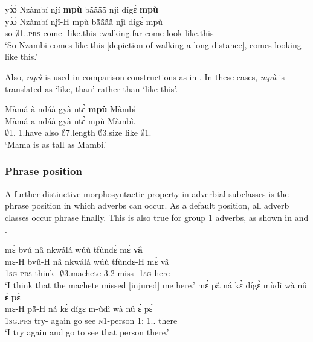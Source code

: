\ea \label{ADVmpu1}
  \glll yɔ́ɔ̀ Nzàmbí njí {\bfseries mpù} bã̂ã̂ã̂ã̂ njì dígɛ̀ {\bfseries mpù} \\
       yɔ́ɔ̀ Nzàmbí njî-H mpù bã̂ã̂ã̂ã̂ njì dígɛ̀ mpù \\
        so $\emptyset$1.{\PN}.\textsc{prs} come-{\R} like.this {\IDEO}:walking.far come look like.this \\
    \trans `So Nzambi comes like this [depiction of walking a long distance], comes looking like this.'
\z

\noindent   Also, {\itshape mpù} is used in comparison constructions as in . In these cases, {\itshape mpù} is translated as `like, than' rather than `like this'.

\ea \label{ADVmpu2}
  \glll Màmá à ndáà gyà ntɛ̀ {\bfseries mpù} Màmbì \\
       Màmá a ndáà gyà ntɛ̀ mpù Màmbì.  \\
        $\emptyset$1.{\PN}  1.have also $\emptyset$7.length $\emptyset$3.size like $\emptyset$1.{\PN} \\
    \trans `Mama is as tall as Mambi.'
\z
\fi %

\subsubsection*{Phrase position}
A further distinctive morphosyntactic property in adverbial subclasses is the phrase position in which adverbs can occur. As a default position, all adverb classes occur phrase finally. This is also true for group 1 adverbs, as shown in  and .

\ea \label{ADV1finala}
  \glll    mɛ́ bvú nâ nkwálá wúù tfùndɛ́ mɛ̀ {\bfseries vâ} \\
           mɛ-H bvû-H nâ nkwálá wúù tfùndɛ-H mɛ̀ vâ \\
              1\textsc{sg}-\textsc{prs} think-{\R} {\COMP} $\emptyset$3.machete 3.{\PST}2 miss-{\R} 1\textsc{sg} here \\
    \trans `I think that the machete missed [injured] me here.'
\ex \label{ADV1finalb}
  \glll mɛ́ pã́ ná kɛ̀ dígɛ̀ mùdì wà nû {\bfseries ɛ́} {\bfseries pɛ́} \\
        mɛ-H pã̂-H ná kɛ̀ dígɛ m-ùdì wà nû ɛ́ pɛ́ \\
        1\textsc{sg}.\textsc{prs} try-{\R} again go see \textsc{n}1-person 1:{\ATT} 1.{\DEM}.{\PROX} {\LOC} there \\
    \trans `I try again and go to see that person there.'
\z


